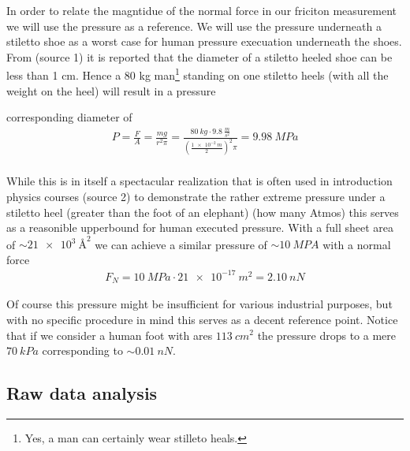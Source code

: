 In order to relate the magntidue of the normal force in our friciton measurement
we will use the pressure as a reference. We will use the pressure underneath a
stiletto shoe as a worst case for human pressure execuation underneath the
shoes. From (source 1) it is reported that the diameter of a stiletto heeled
shoe can be less than 1 cm. Hence a 80 kg man\footnote{Yes, a man can certainly
wear stilleto heals.} standing on one stiletto heels (with all the weight on the
heel) will result in a pressure

corresponding diameter of 
\begin{align*}
  P = \frac{F}{A} = \frac{mg}{r^2\pi} = \frac{\SI{80}{kg} \cdot \SI{9.8}{\frac{m}{s^2}}}{(\frac{\SI{1e-2}{m}}{2})^2 \pi} = \SI{9.98}{MPa} \\
\end{align*} 

While this is in itself a spectacular realization that is often used in
introduction physics courses (source 2) to demonstrate the rather extreme
pressure under a stiletto heel (greater than the foot of an elephant) (how many
Atmos) this serves as a reasonible upperbound for human executed pressure. With
a full sheet area of $\sim\SI{21e3}{Å^2}$ we can achieve a similar pressure of
$\sim \SI{10}{MPA}$ with a normal force 
\begin{align*}
  F_N = \SI{10}{MPa} \cdot \SI{21e-17}{m^2} = \SI{2.10}{nN}  
\end{align*}

Of course this pressure might be insufficient for various industrial purposes,
but with no specific procedure in mind this serves as a decent reference point.
Notice that if we consider a human foot with ares $\SI{113}{cm^2}$ the pressure
drops to a mere $\SI{70}{kPa}$ corresponding to $\sim \SI{0.01}{nN}$.





\newpage
\subsection{Raw data analysis}
